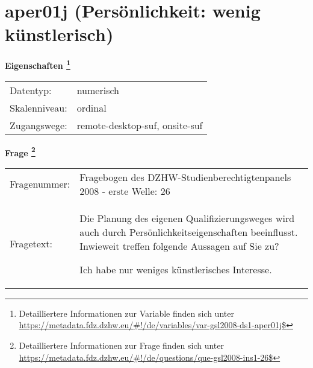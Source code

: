 
    \setcounter{footnote}{0}

    \vspace*{-1.8cm}
	\section{aper01j (Persönlichkeit: wenig künstlerisch)}
	\label{section:aper01j}



    \vspace*{0.5cm}
    \noindent\textbf{Eigenschaften
	\footnote{Detailliertere Informationen zur Variable finden sich unter
		\url{https://metadata.fdz.dzhw.eu/\#!/de/variables/var-gsl2008-ds1-aper01j$}}}\\
	\begin{tabularx}{\hsize}{@{}lX}
	Datentyp: & numerisch \\
	Skalenniveau: & ordinal \\
	Zugangswege: &
	  remote-desktop-suf, 
	  onsite-suf
 \\
    \end{tabularx}



				\vspace*{0.5cm}
                \noindent\textbf{Frage
	                \footnote{Detailliertere Informationen zur Frage finden sich unter
		              \url{https://metadata.fdz.dzhw.eu/\#!/de/questions/que-gsl2008-ins1-26$}}}\\
				\begin{tabularx}{\hsize}{@{}lX}
					Fragenummer: &
					  Fragebogen des DZHW-Studienberechtigtenpanels 2008 - erste Welle:
					  26
 \\
					Fragetext: & Die Planung des eigenen Qualifizierungsweges wird auch durch Persönlichkeitseigenschaften beeinflusst. Inwieweit treffen folgende Aussagen auf Sie zu?\par  Ich habe nur weniges künstlerisches Interesse. \\
				\end{tabularx}





